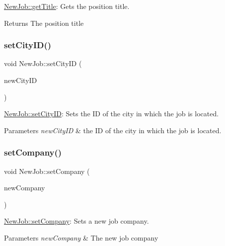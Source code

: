 \hyperlink{class_new_job_aa93c07712d80644b828994a01993c27c}{New\+Job\+::get\+Title}\+: Gets the position title. 

\begin{DoxyReturn}{Returns}
The position title 
\end{DoxyReturn}
\mbox{\label{class_new_job_a715852b239121af2b12ce36eded8faa0}} 
\subsubsection{\texorpdfstring{set\+City\+I\+D()}{setCityID()}}
{\footnotesize\ttfamily void New\+Job\+::set\+City\+ID (\begin{DoxyParamCaption}\item[{int}]{new\+City\+ID }\end{DoxyParamCaption})}



\hyperlink{class_new_job_a715852b239121af2b12ce36eded8faa0}{New\+Job\+::set\+City\+ID}\+: Sets the ID of the city in which the job is located. 


\begin{DoxyParams}{Parameters}
{\em new\+City\+ID} & the ID of the city in which the job is located. \\
\hline
\end{DoxyParams}
\mbox{\label{class_new_job_ad9f522f4a6a45348ecc3ab1229b5eabb}} 
\subsubsection{\texorpdfstring{set\+Company()}{setCompany()}}
{\footnotesize\ttfamily void New\+Job\+::set\+Company (\begin{DoxyParamCaption}\item[{Q\+String}]{new\+Company }\end{DoxyParamCaption})}



\hyperlink{class_new_job_ad9f522f4a6a45348ecc3ab1229b5eabb}{New\+Job\+::set\+Company}\+: Sets a new job company. 


\begin{DoxyParams}{Parameters}
{\em new\+Company} & The new job company \\
\hline
\end{DoxyParams}
\mbox{\label{class_new_job_a0a1d9067e72f797ad3b1f01d44fedb0f}} 
